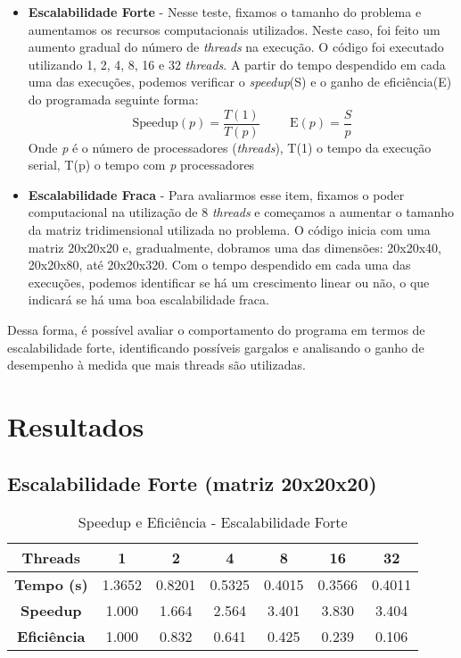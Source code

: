\documentclass[a4paper, 12pt]{article}
\begin{document}
	\begin{itemize}
		\item \textbf{Escalabilidade Forte} - Nesse teste, fixamos o tamanho do problema e aumentamos os recursos computacionais utilizados. Neste caso, foi feito um aumento gradual do número de \textit{threads} na execução. O código foi executado utilizando 1, 2, 4, 8, 16 e 32 \textit{threads}. A partir do tempo despendido em cada uma das execuções, podemos verificar o \textit{speedup}(S) e o ganho de eficiência(E) do programada seguinte forma:
		\[
			\text{Speedup}(p) = \frac{T(1)}{T(p)}  \hspace{1cm} \text{E}(p) = \frac{S}{p}
		\]
		Onde \textit{p} é o número de processadores (\textit{threads}), T(1) o tempo da execução serial, T(p) o tempo com \textit{p} processadores
		
		\item \textbf{Escalabilidade Fraca} - Para avaliarmos esse item, fixamos o poder computacional na utilização de 8 \textit{threads} e começamos a aumentar o tamanho da matriz tridimensional utilizada no problema. O código inicia com uma matriz 20x20x20 e, gradualmente, dobramos uma das dimensões: 20x20x40, 20x20x80, até 20x20x320. Com o tempo despendido em cada uma das execuções, podemos identificar se há um crescimento linear ou não, o que indicará se há uma boa escalabilidade fraca.
	\end{itemize}
	
	 Dessa forma, é possível avaliar o comportamento do programa em termos de escalabilidade forte, identificando possíveis gargalos e analisando o ganho de desempenho à medida que mais threads são utilizadas.
	 
	 \section{Resultados}
	 \subsection{Escalabilidade Forte (matriz 20x20x20)}	 
	 	\begin{table}[H]
	 	\centering
	 	\begin{tabular}{|c|c|c|c|c|c|c|}
	 		\hline
	 		\textbf{Threads} & 1 & 2 & 4 & 8 & 16 & 32 \\ \hline
	 		\textbf{Tempo (s)} & 1.3652 & 0.8201 & 0.5325 & 0.4015 & 0.3566 & 0.4011 \\ \hline
	 		\textbf{Speedup} & 1.000 & 1.664 & 2.564 & 3.401 & 3.830 & 3.404 \\ \hline
	 		\textbf{Eficiência} & 1.000 & 0.832 & 0.641 & 0.425 & 0.239 & 0.106 \\ \hline
	 	\end{tabular}
	 	\caption{Speedup e Eficiência - Escalabilidade Forte}
	 \end{table}
	 
\end{document}
